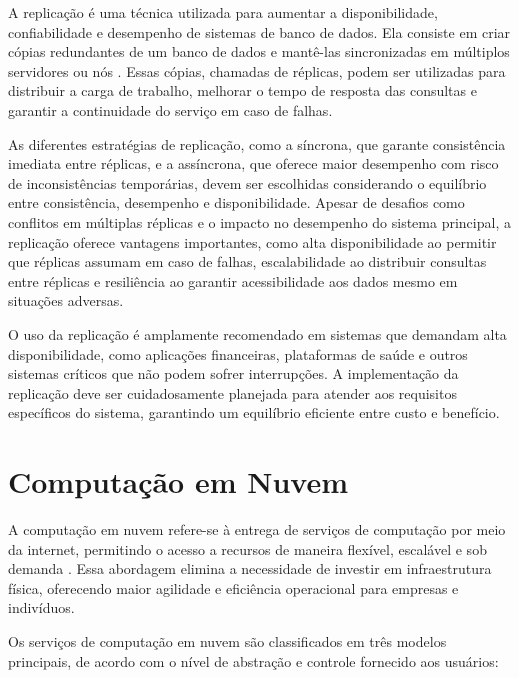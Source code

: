 A replicação é uma técnica utilizada para aumentar a disponibilidade, confiabilidade e desempenho de sistemas de banco de dados. Ela consiste em criar cópias redundantes de um banco de dados e mantê-las sincronizadas em múltiplos servidores ou nós \cite{replication-mongodb}. Essas cópias, chamadas de réplicas, podem ser utilizadas para distribuir a carga de trabalho, melhorar o tempo de resposta das consultas e garantir a continuidade do serviço em caso de falhas.

As diferentes estratégias de replicação, como a síncrona, que garante consistência imediata entre réplicas, e a assíncrona, que oferece maior desempenho com risco de inconsistências temporárias, devem ser escolhidas considerando o equilíbrio entre consistência, desempenho e disponibilidade. Apesar de desafios como conflitos em múltiplas réplicas e o impacto no desempenho do sistema principal, a replicação oferece vantagens importantes, como alta disponibilidade ao permitir que réplicas assumam em caso de falhas, escalabilidade ao distribuir consultas entre réplicas e resiliência ao garantir acessibilidade aos dados mesmo em situações adversas.

O uso da replicação é amplamente recomendado em sistemas que demandam alta disponibilidade, como aplicações financeiras, plataformas de saúde e outros sistemas críticos que não podem sofrer interrupções. A implementação da replicação deve ser cuidadosamente planejada para atender aos requisitos específicos do sistema, garantindo um equilíbrio eficiente entre custo e benefício.


\section{Computação em Nuvem}


A computação em nuvem refere-se à entrega de serviços de computação por meio da internet, permitindo o acesso a recursos de maneira flexível, escalável e sob demanda \cite{what-is-cloud}. Essa abordagem elimina a necessidade de investir em infraestrutura física, oferecendo maior agilidade e eficiência operacional para empresas e indivíduos.

Os serviços de computação em nuvem são classificados em três modelos principais, de acordo com o nível de abstração e controle fornecido aos usuários:

